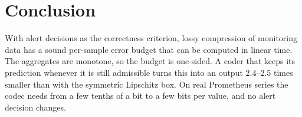 \section{Conclusion}

With alert decisions as the correctness criterion, lossy compression of
monitoring data has a sound per-sample error budget that can be computed
in linear time. The aggregates are monotone, so the budget is one-sided.
A coder that keeps its prediction whenever it is still admissible turns
this into an output 2.4--2.5 times smaller than with the symmetric
Lipschitz box. On real Prometheus series the codec needs from a few
tenths of a bit to a few bits per value, and no alert decision changes.
